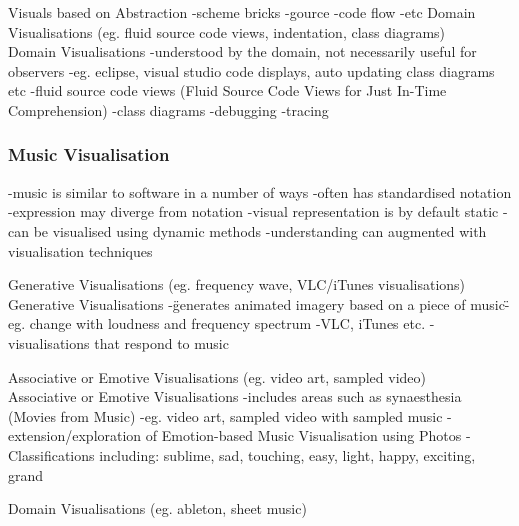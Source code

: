 Visuals based on Abstraction
-scheme bricks
-gource
-code flow
-etc
Domain Visualisations (eg. fluid source code views, indentation, class diagrams)\\

Domain Visualisations
-understood by the domain, not necessarily useful for observers
-eg. eclipse, visual studio code displays, auto updating class diagrams etc
-fluid source code views (Fluid Source Code Views for Just In-Time Comprehension)
-class diagrams
-debugging
-tracing

\subsubsection{Music Visualisation}
-music is similar to software in a number of ways
-often has standardised notation
-expression may diverge from notation
-visual representation is by default static
-can be visualised using dynamic methods
-understanding can augmented with visualisation techniques

Generative Visualisations (eg. frequency wave, VLC/iTunes visualisations)\\

Generative Visualisations
-\"generates animated imagery based on a piece of music\"
-eg. change with loudness and frequency spectrum
-VLC, iTunes etc.
-visualisations that respond to music

Associative or Emotive Visualisations (eg. video art, sampled video)\\

Associative or Emotive Visualisations
-includes areas such as synaesthesia (Movies from Music)
-eg. video art, sampled video with sampled music
-extension/exploration of Emotion-based Music Visualisation using Photos
-Classifications including: sublime, sad, touching, easy, light, happy, exciting, grand


Domain Visualisations (eg. ableton, sheet music)\\

